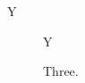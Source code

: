 \documentclass{article}
\begin{document}
\begin{algorithm}[h]Y\caption{Two.}\end{algorithm}
\begin{figure}[h]Y\caption{Three.}\end{figure}
\end{document}
